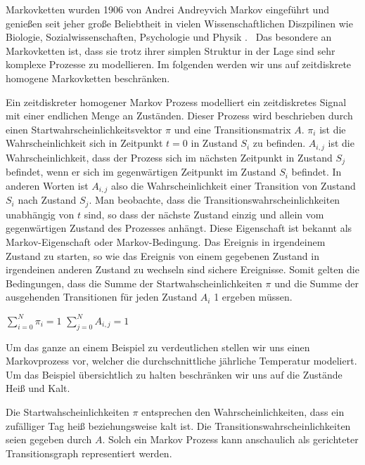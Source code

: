 Markovketten wurden 1906 von Andrei Andreyvich Markov eingeführt und 
genießen seit jeher große Beliebtheit in vielen Wissenschaftlichen 
Diszpilinen wie Biologie, Sozialwissenschaften, Psychologie und Physik .~\cite{gas}
Das besondere an Markovketten ist, dass sie trotz ihrer simplen Struktur 
in der Lage sind sehr komplexe Prozesse zu modellieren.
Im folgenden werden wir uns auf zeitdiskrete homogene Markovketten beschränken.

Ein zeitdiskreter homogener Markov Prozess modelliert ein zeitdiskretes Signal mit einer endlichen Menge an Zuständen.
Dieser Prozess wird beschrieben durch einen Startwahrscheinlichkeitsvektor $\pi$ und eine Transitionsmatrix $A$.
$\pi_i$ ist die Wahrscheinlichkeit sich in Zeitpunkt $t=0$ in Zustand $S_i$ zu befinden.
$A_{i,j}$ ist die Wahrscheinlichkeit, dass der Prozess sich im nächsten Zeitpunkt in Zustand $S_j$ befindet,
wenn er sich im gegenwärtigen Zeitpunkt im Zustand $S_i$ befindet. In anderen Worten ist $A_{i,j}$ also die Wahrscheinlichkeit einer 
Transition von Zustand $S_i$ nach Zustand $S_j$.
Man beobachte, dass die Transitionswahrscheinlichkeiten unabhängig von $t$ sind, so dass der nächste Zustand 
einzig und allein vom gegenwärtigen Zustand des Prozesses anhängt.
Diese Eigenschaft ist bekannt als Markov-Eigenschaft oder Markov-Bedingung.
Das Ereignis in irgendeinem Zustand zu starten, so wie das Ereignis von einem gegebenen Zustand in irgendeinen anderen Zustand zu wechseln sind sichere Ereignisse.
Somit gelten die Bedingungen, dass die Summe der Startwahscheinlichkeiten $\pi$
und die Summe der ausgehenden Transitionen für jeden Zustand $A_i$ 1 ergeben müssen.

$\sum_{i = 0}^{N} \pi_i = 1 $
$\sum_{j = 0}^{N} A_{i,j} = 1 $

Um das ganze an einem Beispiel zu verdeutlichen stellen wir uns einen Markovprozess vor, welcher 
die durchschnittliche jährliche Temperatur modeliert. Um das Beispiel übersichtlich zu halten beschränken wir uns auf die Zustände Heiß und Kalt.

Die Startwahscheinlichkeiten $\pi$ entsprechen den Wahrscheinlichkeiten, dass ein zufälliger Tag heiß beziehungsweise kalt ist.
Die Transitionswahrscheinlichkeiten seien gegeben durch $A$.
Solch ein Markov Prozess kann anschaulich als gerichteter Transitionsgraph representiert werden.

